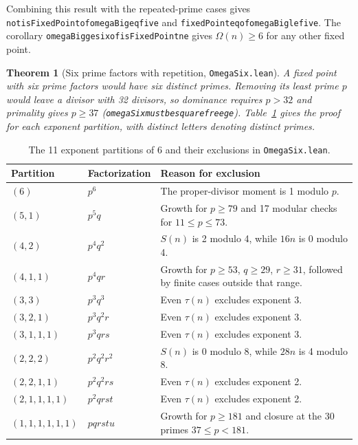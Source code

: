 \documentclass[11pt,reqno]{amsart}
\theoremstyle{plain}
\newtheorem{theorem}{Theorem}[section]
\theoremstyle{definition}
\theoremstyle{remark}
\newcommand{\leanid}[1]{\texttt{\upshape\def\_{\char95\relax}#1}}
\begin{document}
Combining this result with the repeated-prime cases gives \leanid{not\_\allowbreak isFixedPoint\_\allowbreak of\_\allowbreak omegaBig\_\allowbreak eq\_\allowbreak five} and \leanid{fixedPoint\_\allowbreak eq\_\_\allowbreak of\_\allowbreak omegaBig\_\allowbreak le\_\allowbreak five}. The corollary \leanid{omegaBig\_\allowbreak ge\_\allowbreak six\_\allowbreak of\_\allowbreak isFixedPoint\_\allowbreak ne\_\allowbreak 21} gives $\Omega(n)\ge6$ for any other fixed point.

\begin{theorem}[Six prime factors with repetition, \leanid{OmegaSix.lean}]
A fixed point with six prime factors would have six distinct primes. Removing its least prime $p$ would leave a divisor with 32 divisors, so dominance requires $p>32$ and primality gives $p\ge37$ (\leanid{omegaSix\_\allowbreak must\_\allowbreak be\_\allowbreak squarefree\_\allowbreak ge\_\allowbreak 37}). Table~\ref{tab:partitions} gives the proof for each exponent partition, with distinct letters denoting distinct primes.
\end{theorem}

\begin{table}[htbp]
\centering
\caption{The 11 exponent partitions of 6 and their exclusions in \leanid{OmegaSix.lean}.}
\label{tab:partitions}
\small
\begin{tabular}{@{}ll>{\raggedright\arraybackslash}p{8cm}@{}}
\toprule
Partition & Factorization & Reason for exclusion \\
\midrule
$(6)$ & $p^6$ & The proper-divisor moment is 1 modulo $p$. \\
$(5,1)$ & $p^5q$ & Growth for $p\ge79$ and 17 modular checks for $11\le p\le73$. \\
$(4,2)$ & $p^4q^2$ & $S(n)$ is 2 modulo 4, while $16n$ is 0 modulo 4. \\
$(4,1,1)$ & $p^4qr$ & Growth for $p\ge53$, $q\ge29$, $r\ge31$, followed by finite cases outside that range. \\
$(3,3)$ & $p^3q^3$ & Even $\tau(n)$ excludes exponent 3. \\
$(3,2,1)$ & $p^3q^2r$ & Even $\tau(n)$ excludes exponent 3. \\
$(3,1,1,1)$ & $p^3qrs$ & Even $\tau(n)$ excludes exponent 3. \\
$(2,2,2)$ & $p^2q^2r^2$ & $S(n)$ is 0 modulo 8, while $28n$ is 4 modulo 8. \\
$(2,2,1,1)$ & $p^2q^2rs$ & Even $\tau(n)$ excludes exponent 2. \\
$(2,1,1,1,1)$ & $p^2qrst$ & Even $\tau(n)$ excludes exponent 2. \\
$(1,1,1,1,1,1)$ & $pqrstu$ & Growth for $p\ge181$ and closure at the 30 primes $37\le p<181$. \\
\bottomrule
\end{tabular}
\end{table}
\end{document}
